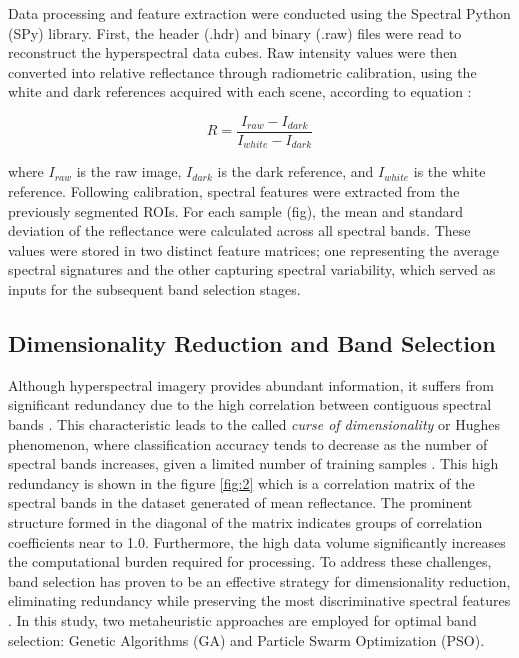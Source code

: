 \documentclass[aipa,article,submit,pdftex,moreauthors]{Definitions/mdpi}
\begin{document}
Data processing and feature extraction were conducted using the Spectral Python (SPy) library. 
First, the header (.hdr) and binary (.raw) files were read to reconstruct the hyperspectral data cubes. 
Raw intensity values were then converted into relative reflectance through radiometric calibration, using the white and dark references acquired with each scene, according to equation \cite{morales_laboratory_2022}:

\begin{equation}
    R=\dfrac{I_{raw}-I_{dark}}{I_{white}-I_{dark}}
\end{equation}


where $I_{raw}$ is the raw image, $I_{dark}$ is the dark reference, and $I_{white}$ is the white reference. 
Following calibration, spectral features were extracted from the previously segmented ROIs. 
For each sample (fig), the mean and standard deviation of the reflectance were calculated across all spectral bands. 
These values were stored in two distinct feature matrices; one representing the average spectral signatures and the other capturing spectral variability, which served as inputs for the subsequent band selection stages.

\subsection{Dimensionality Reduction and Band Selection}

Although hyperspectral imagery provides abundant information, it suffers from significant redundancy due to the high correlation between contiguous spectral bands \cite{sawant_survey_2020}. 
This characteristic leads to the called \textit{curse of dimensionality} or Hughes phenomenon, where classification accuracy tends to decrease as the number of spectral bands increases, given a limited number of training samples \cite{hughes_mean_1968}. 
This high redundancy is shown in the figure \ref{fig:2} which is a correlation matrix of the spectral bands in the dataset generated of mean reflectance. 
The prominent structure formed in the diagonal of the matrix indicates groups of correlation coefficients near to 1.0. 
Furthermore, the high data volume significantly increases the computational burden required for processing. 
To address these challenges, band selection has proven to be an effective strategy for dimensionality reduction, eliminating redundancy while preserving the most discriminative spectral features \cite{sawant_survey_2020} \cite{nagasubramanian_hyperspectral_2018}. 
In this study, two metaheuristic approaches are employed for optimal band selection: Genetic Algorithms (GA) and Particle Swarm Optimization (PSO). 
\end{document}
